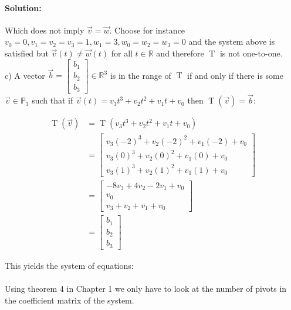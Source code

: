 \documentclass[12pt, letterpaper]{article}
\newcommand{\R}{\mathbb{R}}
\theoremstyle{statement}
\theoremstyle{statement}
\newenvironment{Solution}{\noindent\ignorespaces\paragraph{Solution:}}{\hfill \ding{122}\par\noindent}
\begin{document}
\begin{Solution}
    Which does not imply $\Vec{v}=\Vec{w}$. Choose for instance $v_0=0,v_1=v_2=v_3=1,w_1=3,w_0=w_2=w_3=0$ and the system above is satisfied but $\Vec{v}(t)\neq\Vec{w}(t)$ for all $t \in \R$ and therefore $\operatorname{T}$ is not one-to-one.\\
    
    c) A vector $\Vec{b}=\begin{bmatrix} b_1\\b_2\\b_3\end{bmatrix} \in \R^3$ is in the range of $\operatorname{T}$ if and only if there is some $\Vec{v} \in \mathbb{P}_3$ such that if $\Vec{v}(t)=v_3t^3+v_2t^2+v_1t+v_0$ then $\operatorname{T}(\Vec{v})=\Vec{b}$: 
    
    \begin{align*}
    \operatorname{T}(\Vec{v}) &= \operatorname{T}(v_3t^3+v_2t^2+v_1t+v_0) \\
    &= \begin{bmatrix}
    v_3(-2)^3 + v_2(-2)^2 + v_1(-2) + v_0 \\
    v_3(0)^3 + v_2(0)^2 + v_1(0) + v_0 \\
    v_3(1)^3 + v_2(1)^2 + v_1(1) + v_0 
    \end{bmatrix} \\
    &= 
    \begin{bmatrix}
    -8v_3 + 4v_2 - 2v_1 + v_0 \\
    v_0 \\
    v_3 + v_2 + v_1 + v_0 
    \end{bmatrix} \\
    &= \begin{bmatrix}
    b_1 \\
    b_2 \\
    b_3
    \end{bmatrix}
    \end{align*}
    
    This yields the system of equations:\\
    
    \\
    
    Using theorem 4 in Chapter 1 we only have to look at the number of pivots in the coefficient matrix of the system. 
    

\end{Solution}
\end{document}
